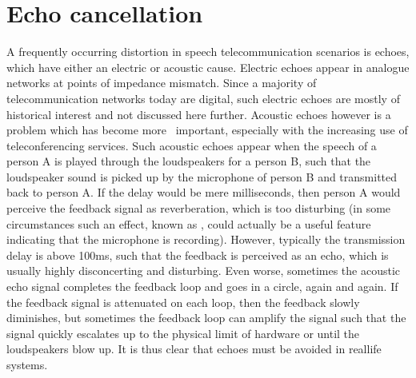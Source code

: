 \documentclass[letterpaper,10pt,english]{jupyterBook}
\begin{document}
\section{Echo cancellation}
\label{\detokenize{Enhancement/Echo_cancellation:echo-cancellation}}\label{\detokenize{Enhancement/Echo_cancellation::doc}}
\sphinxAtStartPar
A frequently occurring distortion in speech telecommunication scenarios
is echoes, which have either an electric or acoustic cause. Electric
echoes appear in analogue networks at points of impedance mismatch.
Since a majority of telecommunication networks today are digital, such
electric echoes are mostly of historical interest and not discussed here
further. Acoustic echoes however is a problem which has become more 
important, especially with the increasing use of teleconferencing
services. Such acoustic echoes appear when the speech of a person A is
played through the loudspeakers for a person B, such that the
loudspeaker sound is picked up by the microphone of person B and
transmitted back to person A. If the delay would be mere milliseconds,
then person A would perceive the feedback signal as reverberation, which
is  too disturbing (in some circumstances such an effect, known as
, could actually be a useful feature indicating that the
microphone is recording). However, typically the transmission delay is
above 100ms, such that the feedback is perceived as an echo, which is
usually highly disconcerting and disturbing. Even worse, sometimes the
acoustic echo signal completes the feedback loop and goes in a circle,
again and again. If the feedback signal is attenuated on each loop, then
the feedback slowly diminishes, but sometimes the feedback loop can
amplify the signal such that the signal quickly escalates up to the
physical limit of hardware or until the loudspeakers blow up. It is thus
clear that echoes must be avoided in real\sphinxhyphen{}life systems.
\end{document}

